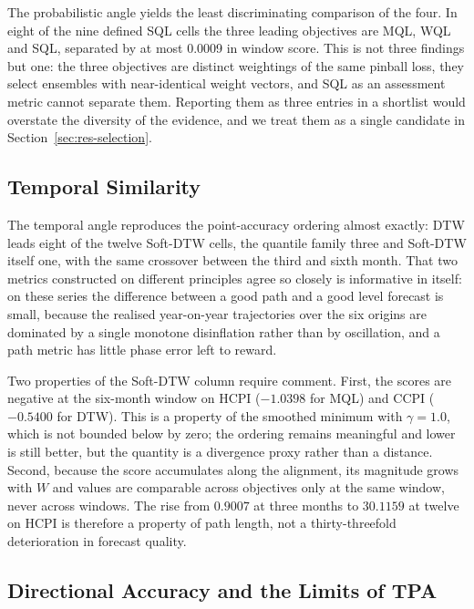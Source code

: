 \documentclass[12pt]{article}
\begin{document}
The probabilistic angle yields the least discriminating comparison of the four.
In eight of the nine defined SQL cells the three leading objectives are MQL,
WQL and SQL, separated by at most 0.0009 in window score. This is not three
findings but one: the three objectives are distinct weightings of the same
pinball loss, they select ensembles with near-identical weight vectors, and SQL
as an assessment metric cannot separate them. Reporting them as three entries
in a shortlist would overstate the diversity of the evidence, and we treat them
as a single candidate in Section~\ref{sec:res-selection}.

\subsection{Temporal Similarity}
\label{sec:res-temporal}

The temporal angle reproduces the point-accuracy ordering almost exactly: DTW
leads eight of the twelve Soft-DTW cells, the quantile family three and
Soft-DTW itself one, with the same crossover between the third and sixth
month. That two
metrics constructed on different principles agree so closely is informative in
itself: on these series the difference between a good path and a good level
forecast is small, because the realised year-on-year trajectories over the six
origins are dominated by a single monotone disinflation rather than by
oscillation, and a path metric has little phase error left to reward.

Two properties of the Soft-DTW column require comment. First, the scores are
negative at the six-month window on HCPI ($-1.0398$ for MQL) and CCPI
($-0.5400$ for DTW). This is a property of the smoothed minimum with
$\gamma = 1.0$, which is not bounded below by zero; the ordering remains
meaningful and lower is still better, but the quantity is a divergence proxy
rather than a distance. Second, because the score accumulates along the
alignment, its magnitude grows with $W$ and values are comparable across
objectives only at the same window, never across windows. The rise from
$0.9007$ at three months to $30.1159$ at twelve on HCPI is therefore a property
of path length, not a thirty-threefold deterioration in forecast quality.

\subsection{Directional Accuracy and the Limits of TPA}
\label{sec:res-direction}
\end{document}
